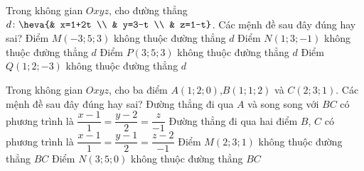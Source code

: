 \begin{ex}%
Trong không gian $Oxyz$, cho đường thẳng $d\colon \heva{& x=1+2t \\ 
		& y=3-t \\ 
		& z=1-t}$. Các mệnh đề sau đây đúng hay sai?
	\choiceTF
	{ Điểm $M\left( -3;5;3 \right)$ không thuộc đường thẳng $d$}
	{ \True Điểm $N\left( 1;3;-1 \right)$ không thuộc đường thẳng $d$}
	{ \True Điểm $P\left( 3;5;3 \right)$ không thuộc đường thẳng $d$}
	{ \True Điểm $Q\left( 1;2;-3 \right)$ không thuộc đường thẳng $d$}
\end{ex}
\begin{ex}%
Trong không gian $Oxyz$, cho ba điểm $A(1;2;0)$,$B(1;1;2)$ và $C(2;3;1)$. Các mệnh đề sau đây đúng hay sai?
	\choiceTF
	{ \True Đường thẳng đi qua $A$ và song song với $BC$ có phương trình là $\dfrac{x-1}{1}=\dfrac{y-2}{2}=\dfrac{z}{-1}$}
	{\True Đường thẳng đi qua hai điểm $B$, $C$ có phương trình là $\dfrac{x-1}{1}=\dfrac{y-1}{2}=\dfrac{z-2}{-1}$}
	{ Điểm $M\left( 2;3;1 \right)$ không thuộc đường thẳng $BC$}
	{\True  Điểm $N\left( 3;5;0 \right)$ không thuộc đường thẳng $BC$}
\end{ex}
